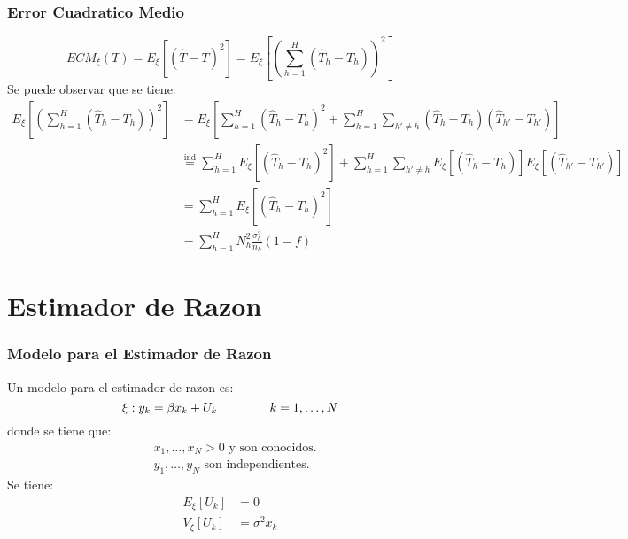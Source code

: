﻿\documentclass{beamer}
\begin{document}
\begin{frame}[allowframebreaks*]
\frametitle{Error Cuadratico Medio}
{\footnotesize
\begin{equation*}
ECM_\xi(T)=E_\xi[(\hat T-T)^2]=E_\xi\left[\left(\sum\limits_{h=1}^H(\hat T_h-T_h)\right)^2\right]
\end{equation*}
Se puede observar que se tiene:
\begin{align*}
E_\xi\left[\left(\sum\limits_{h=1}^H(\hat T_h-T_h)\right)^2\right]&=E_\xi\left[\sum\limits_{h=1}^H(\hat T_h-T_h)^2+\sum\limits_{h=1}^H\sum_{h \prime \neq h}(\hat T_h-T_h)(\hat T_{h \prime}-T_{h \prime})\right]\\
&\stackrel{\text{ind}}{=}\sum\limits_{h=1}^H E_\xi\left[(\hat T_h-T_h)^2\right]+\sum\limits_{h=1}^H\sum_{h \prime \neq h}E_\xi\left[(\hat T_h-T_h)\right]E_\xi\left[(\hat T_{h \prime}-T_{h \prime})\right]\\
&=\sum\limits_{h=1}^H E_\xi\left[(\hat T_h-T_h)^2\right]\\
&=\sum\limits_{h=1}^H N_h^2\frac{\sigma_h^2}{n_h}(1-f)
\end{align*}}
\end{frame}

\section{Estimador de Razon}
 \tableofcontents[currentsection]

\begin{frame}[allowframebreaks*]
\frametitle{Modelo para el Estimador de Razon}
\footnotesize{
Un modelo para el estimador de razon es:
$$\xi: y_k=\beta x_k+U_k \hspace{1.5cm}k=1,\dots,N$$
donde se tiene que:
\begin{align*}
&x_1,\ldots,x_N>0 \text{ y son conocidos.}\\
&y_1,\ldots,y_N \text{ son independientes.}
\end{align*}
Se tiene:
\begin{align*}
E_\xi[U_k]&=0\\
V_{\xi}[U_k]&=\sigma^2x_k\\
\end{align*}}
\end{frame}
\end{document}
